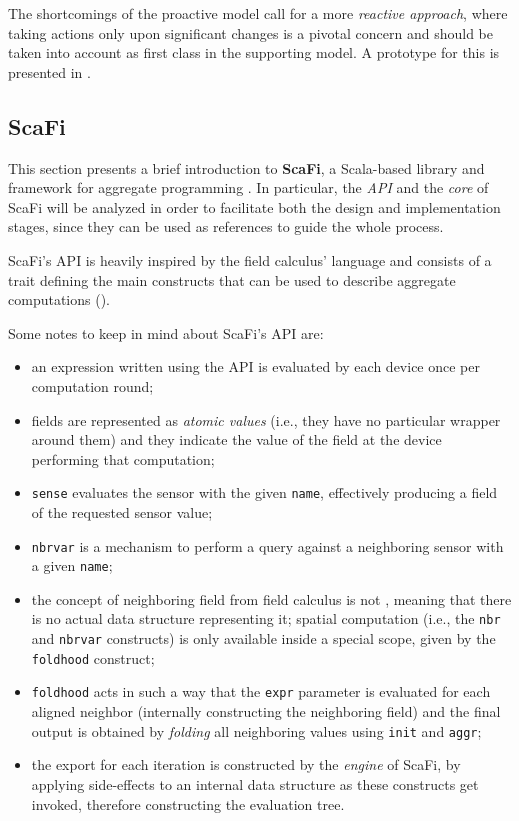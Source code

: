 The shortcomings of the proactive model call for a more \textit{reactive approach}, where taking actions only upon significant changes is a pivotal concern and should be taken into account as first class in the supporting model.
%
A prototype for this is presented in .

\subsection{ScaFi}
\label{sec:scafi}

This section presents a brief introduction to \textbf{ScaFi}, a Scala-based library and framework for aggregate programming \cite{scafi-docs}.
%
In particular, the \textit{API} and the \textit{core} of ScaFi will be analyzed in order to facilitate both the design and implementation stages, since they can be used as references to guide the whole process.

ScaFi's API is heavily inspired by the field calculus' language and consists of a trait defining the main constructs that can be used to describe aggregate computations ().
%

%
Some notes to keep in mind about ScaFi's API are:
%
\begin{itemize}
    \item an expression written using the API is evaluated by each device once per computation round;
    \item fields are represented as \textit{atomic values} (i.e., they have no particular wrapper around them) and they indicate the value of the field at the device performing that computation;
    \item \texttt{sense} evaluates the sensor with the given \texttt{name}, effectively producing a field of the requested sensor value;
    \item \texttt{nbrvar} is a mechanism to perform a query against a neighboring sensor with a given \texttt{name};
    \item the concept of neighboring field from field calculus is not , meaning that there is no actual data structure representing it; spatial computation (i.e., the \texttt{nbr} and \texttt{nbrvar} constructs) is only available inside a special scope, given by the \texttt{foldhood} construct;
    \item \texttt{foldhood} acts in such a way that the \texttt{expr} parameter is evaluated for each aligned neighbor (internally constructing the neighboring field) and the final output is obtained by \textit{folding} all neighboring values using \texttt{init} and \texttt{aggr};
    \item the export for each iteration is constructed by the \textit{engine} of ScaFi, by applying side-effects to an internal data structure as these constructs get invoked, therefore constructing the evaluation tree.
\end{itemize}

